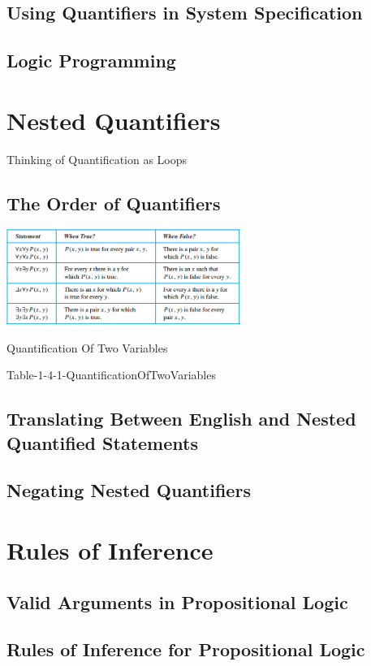 \documentclass[11pt]{book} %
\theoremstyle {definition}
\theoremstyle {remark}
\begin{document}
    \subsection {Using Quantifiers in System Specification}
    \subsection {Logic Programming}


\section {Nested Quantifiers}
Thinking of Quantification as Loops
    \subsection {The Order of Quantifiers}
\begin{table}[htbp]
  \includegraphics [width=3in]{Table-1-4-1-QuantificationOfTwoVariables}
  \caption{Quantification Of Two Variables}
  \label{table:QuantificationOfTwoVariables}
  \end{table}
    
Table-1-4-1-QuantificationOfTwoVariables
    \subsection {Translating Between English and Nested Quantified Statements}
    \subsection {Negating Nested Quantifiers}


\section {Rules of Inference}
   \subsection {Valid Arguments in Propositional Logic}
   \subsection {Rules of Inference for Propositional Logic}
\end{document}
